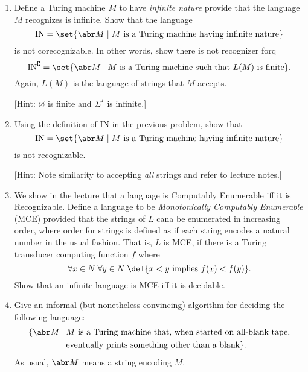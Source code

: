\documentclass{cs81-homework}
\begin{document}
\begin{enumerate}
\item {} Define a Turing machine \(M\) to have \emph{infinite nature}
  provide that the language \(M\) recognizes is infinite.  Show that the
  language
  \[
    \mathrm{IN} = \set{\abr M \mid \text{\(M\) is a Turing machine having
        infinite nature}}
  \]
  is not corecognizable.  In other words, show there is not recognizer forq
  \[
    \mathrm{IN}^\complement = \set{\abr M \mid \text{\(M\) is a Turing machine
        such that \(L(M)\) is finite}}.
  \]
  Again, \(L(M)\) is the language of strings that \(M\) accepts.

  [Hint: \(\varnothing\) is finite and \(\Sigma^\star\) is infinite.]

  \begin{solution}
  \end{solution}

\item {} Using the definition of \(\mathrm{IN}\) in the previous
  problem, show that
  \[
    \mathrm{IN} = \set{\abr M \mid \text{\(M\) is a Turing machine having
        infinite nature}}
  \]
  is not recognizable.

  [Hint: Note similarity to accepting \emph{all} strings and refer to lecture
  notes.]

  \begin{solution}
  \end{solution}

\item {} We show in the lecture that a language is Computably
  Enumerable iff it is Recognizable.  Define a language to be
  \emph{Monotonically Computably Enumerable} (MCE) provided that the strings of
  \(L\) cana be enumerated in increasing order, where order for strings is
  defined as if each string encodes a natural number in the usual fashion.  That
  is, \(L\) is MCE, if there is a Turing transducer computing function \(f\)
  where
  \[
    \forall x \in N \; \forall y \in N \; \del{\text{\(x<y\) implies
        \(f(x) < f(y)\)}}.
  \]
  Show that an infinite language is MCE iff it is decidable.
  
  \begin{solution}
  \end{solution}

\item {} Give an informal (but nonetheless convincing) algorithm for
  deciding the following language:
  \begin{align*}
    \{\abr M \mid\: &\text{\(M\) is a Turing machine that, when started on
                      all-blank tape,} \\
                    & \text{eventually prints something other than a blank}\}.
  \end{align*}
  As usual, \(\abr M\) means a string encoding \(M\). 

  \begin{solution}
  \end{solution}

\end{enumerate}
    
\end{document}
